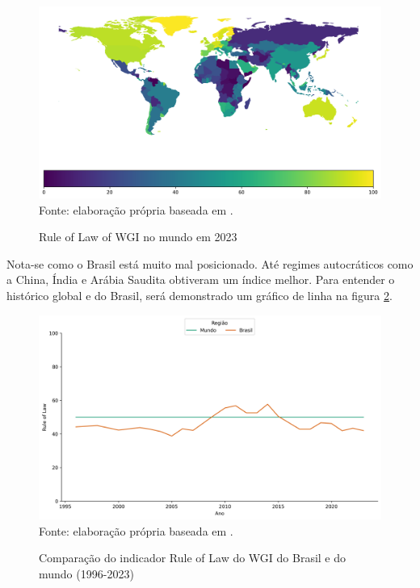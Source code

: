 \begin{figure}[H]
	\centering
	\caption{Rule of Law of WGI no mundo em 2023}
	\includegraphics[width=1\linewidth]{figuras/mapa_coropletico_wgi_rl.png}
	\label{fig:mapa_coropletico_wgi_rl}
	\footnotesize{Fonte: elaboração própria baseada em \cite{wgi_dados}.}
\end{figure}

Nota-se como o Brasil está muito mal posicionado. Até regimes autocráticos como a China, Índia e Arábia Saudita obtiveram um índice melhor. Para entender o histórico global e do Brasil, será demonstrado um gráfico de linha na figura \ref{fig:comparacao_wgi_rl_brasil_mundo}.

\begin{figure}[H]
	\centering
	\caption{Comparação do indicador Rule of Law do WGI do Brasil e do mundo (1996-2023)}
	\includegraphics[width=1\linewidth]{figuras/comparacao_wgi_rl_brasil_mundo}
	\label{fig:comparacao_wgi_rl_brasil_mundo}
	\footnotesize{Fonte: elaboração própria baseada em \cite{wgi_dados}.}
\end{figure}

